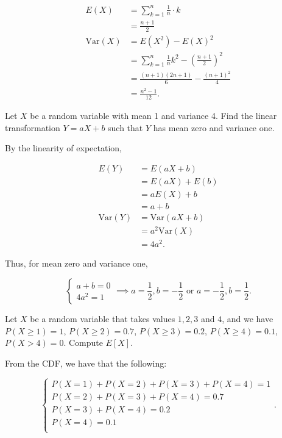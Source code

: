 \documentclass[answers]{exam}
\begin{document}
\begin{questions}
\begin{solution}
\begin{align*}
E(X) &= \sum_{k=1}^{n} \frac{1}{n} \cdot k \\ 
&= \frac{n+1}{2} \\
\text{Var}(X) &= E(X^2) - E(X)^2 \\ 
&= \sum_{k=1}^{n} \frac{1}{n} k^2 - \left( \frac{n+1}{2} \right) ^2 \\ 
&= \frac{(n+1)(2n+1)}{6} - \frac{(n+1)^2}{4} \\ 
&= \frac{n^2 - 1}{12} 
.\end{align*}
\end{solution}

\question[10]
Let \(X\) be a random variable with mean 1 and variance 4. Find the linear
transformation \(Y=aX+b\) such that \(Y\) has mean zero and variance one.

\begin{solution}
By the linearity of expectation,

\begin{align*}
E(Y) &= E(aX + b) \\ 
&= E(aX) + E(b) \\ 
&= aE(X) + b \\ 
&= a + b \\ 
\text{Var}(Y) &= \text{Var}(aX + b) \\ 
&= a^2\text{Var}(X) \\ 
&= 4a^2
.\end{align*}

Thus, for mean zero and variance one,

\[
\begin{cases}
    a + b = 0 \\ 
    4a^2 = 1
\end{cases} \implies a = \frac{1}{2}, b = -\frac{1}{2} \text{ or } a = -\frac{1}{2}, b = \frac{1}{2}
.\] 
\end{solution}

\question[10]
Let \(X\) be a random variable that takes values \(1,2,3\) and \(4\), and we
have \(P(X\geq 1)=1\), \(P(X\geq 2)=0.7\), \(P(X\geq 3)=0.2\), \(P(X\geq
4)=0.1\), \(P(X>4)=0\). Compute \(E[X]\).

\begin{solution}
From the CDF, we have that the following:

\[
\begin{cases}
    P(X=1) + P(X=2) + P(X=3) + P(X=4) = 1 \\ 
    P(X=2) + P(X=3) + P(X=4) = 0.7 \\ 
    P(X=3) + P(X=4) = 0.2 \\ 
    P(X=4) = 0.1 \\ 
\end{cases}
.\] 


\end{solution}
\end{questions}
\end{document}
